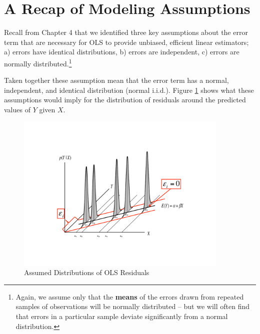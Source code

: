 \documentclass[11pt,openany]{book}\usepackage[]{graphicx}\usepackage[]{color}
\begin{document}
{\section{A Recap of Modeling Assumptions}

Recall from Chapter 4 that we identified three key assumptions about the error term that are necessary for OLS to provide unbiased, efficient linear estimators; a) errors have identical distributions, b) errors are independent, c) errors are normally distributed.\footnote{Again, we assume only that the \textbf{means} of the errors drawn from repeated samples of observations will be normally distributed -- but we will often find that errors in a particular sample deviate significantly from a normal distribution.}

\begin{grbox}
\end{grbox}

Taken together these assumption mean that the error term has a normal, independent, and identical distribution (normal i.i.d.). Figure \ref{fig:residdist} shows what these assumptions would imply for the distribution of residuals around the predicted values of $Y$ given $X$.


\begin{figure}
  \centering
  \includegraphics[width=4in]{10_SimpleDiagnostics/residdist.pdf}%
  \caption{Assumed Distributions of OLS Residuals \label{fig:residdist}}
\end{figure}

}
\end{document}
